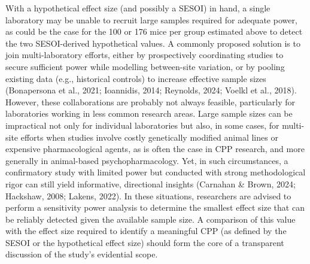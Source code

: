 \documentclass[authordate, meta]{jote-new-article}
\begin{document}
	With a hypothetical effect size (and possibly a SESOI) in hand, a single laboratory may be unable to recruit large samples required for adequate power, as could be the case for the 100 or 176 mice per group estimated above to detect the two SESOI-derived hypothetical values. A commonly proposed solution is to join multi-laboratory efforts, either by prospectively coordinating studies to secure sufficient power while modelling between-site variation, or by pooling existing data (e.g., historical controls) to increase effective sample sizes (Bonapersona et al., 2021; Ioannidis, 2014; Reynolds, 2024; Voelkl et al., 2018). However, these collaborations are probably not always feasible, particularly for laboratories working in less common research areas. Large sample sizes can be impractical not only for individual laboratories but also, in some cases, for multi-site efforts when studies involve costly genetically modified animal lines or expensive pharmacological agents, as is often the case in CPP research, and more generally in animal-based psychopharmacology. Yet, in such circumstances, a confirmatory study with limited power but conducted with strong methodological rigor can still yield informative, directional insights (Carnahan \& Brown, 2024; Hackshaw, 2008; Lakens, 2022). In these situations, researchers are advised to perform a sensitivity power analysis to determine the smallest effect size that can be reliably detected given the available sample size. A comparison of this value with the effect size required to identify a meaningful CPP (as defined by the SESOI or the hypothetical effect size) should form the core of a transparent discussion of the study's evidential scope.
\end{document}
